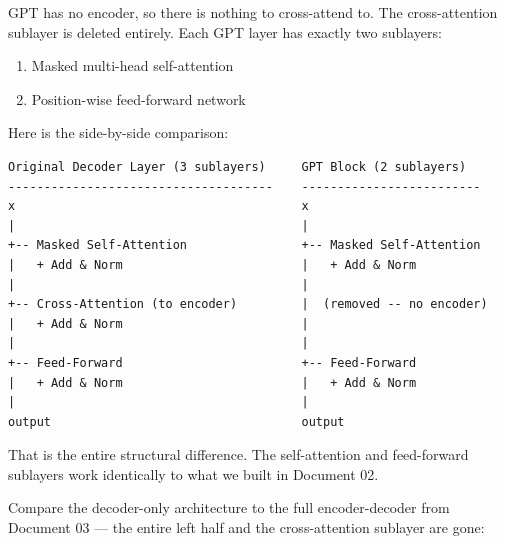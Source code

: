 GPT has no encoder, so there is nothing to cross-attend to. The cross-attention sublayer is deleted entirely. Each GPT layer has exactly two sublayers:

\begin{enumerate}
  \item Masked multi-head self-attention
  \item Position-wise feed-forward network
\end{enumerate}

Here is the side-by-side comparison:

\begin{verbatim}
Original Decoder Layer (3 sublayers)     GPT Block (2 sublayers)
-------------------------------------    -------------------------
x                                        x
|                                        |
+-- Masked Self-Attention                +-- Masked Self-Attention
|   + Add & Norm                         |   + Add & Norm
|                                        |
+-- Cross-Attention (to encoder)         |  (removed -- no encoder)
|   + Add & Norm                         |
|                                        |
+-- Feed-Forward                         +-- Feed-Forward
|   + Add & Norm                         |   + Add & Norm
|                                        |
output                                   output
\end{verbatim}

That is the entire structural difference. The self-attention and feed-forward sublayers work identically to what we built in Document 02.

Compare the decoder-only architecture to the full encoder-decoder from Document 03 --- the entire left half and the cross-attention sublayer are gone:

